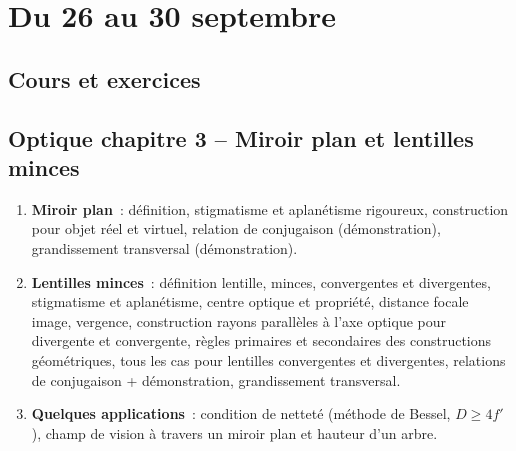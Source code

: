 \documentclass[a4paper, 12pt, final, garamond]{book}
\begin{document}
\setcounter{chapter}{2}

\chapter{Du 26 au 30 septembre}

\section{Cours et exercices}

\section*{Optique chapitre 3 -- Miroir plan et lentilles minces}
\begin{enumerate}[label=\Roman*]
    \item \textbf{Miroir plan}~: définition, stigmatisme et aplanétisme
        rigoureux, construction pour objet réel et virtuel, relation de
        conjugaison (démonstration), grandissement transversal (démonstration).
    \item \textbf{Lentilles minces}~: définition lentille, minces, convergentes
        et divergentes, stigmatisme et aplanétisme, centre optique et propriété,
        distance focale image, vergence, construction rayons parallèles à l'axe
        optique pour divergente et convergente, règles primaires et secondaires
        des constructions géométriques, tous les cas pour lentilles convergentes
        et divergentes, relations de conjugaison + démonstration, grandissement
        transversal.
    \item \textbf{Quelques applications}~: condition de netteté (méthode de
        Bessel, $D \geq 4f'$), champ de vision à travers un miroir plan et
        hauteur d'un arbre.
\end{enumerate}
\end{document}

